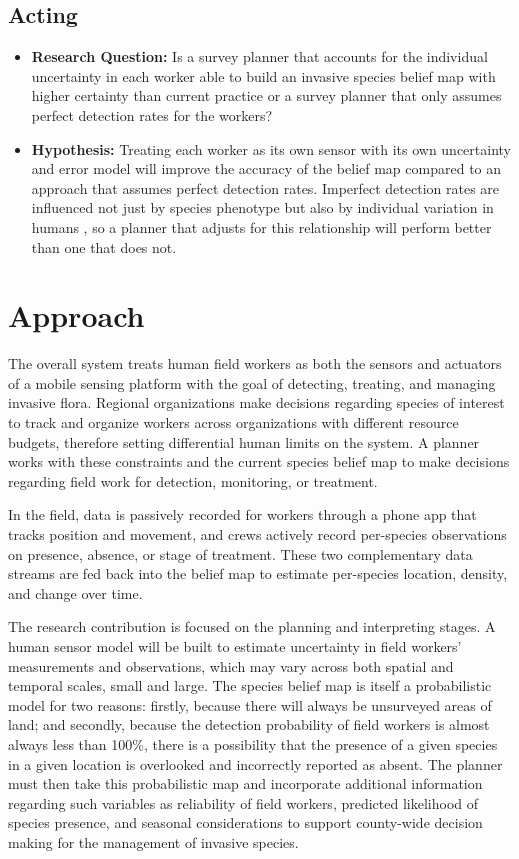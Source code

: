 \documentclass{article}
\begin{document}
\subsection{Acting}

    \begin{itemize}
        \item \textbf{Research Question:} Is a survey planner that accounts for the individual uncertainty in each worker able to build an invasive species belief map with higher certainty than current practice or a survey planner that only assumes perfect detection rates for the workers?

        \item \textbf{Hypothesis:} Treating each worker as its own sensor with its own uncertainty and error model will improve the accuracy of the belief map compared to an approach that assumes perfect detection rates. Imperfect detection rates are influenced not just by species phenotype but also by individual variation in humans \cite{detectability-global-weed}, so a planner that adjusts for this relationship will perform better than one that does not.
    \end{itemize}


\section{Approach}
The overall system treats human field workers as both the sensors and actuators of a mobile sensing platform with the goal of detecting, treating, and managing invasive flora. Regional organizations make decisions regarding species of interest to track and organize workers across organizations with different resource budgets, therefore setting differential human limits on the system. A planner works with these constraints and the current species belief map to make decisions regarding field work for detection, monitoring, or treatment.

In the field, data is passively recorded for workers through a phone app that tracks position and movement, and crews actively record per-species observations on presence, absence, or stage of treatment. These two complementary data streams are fed back into the belief map to estimate per-species location, density, and change over time. 

The research contribution is focused on the planning and interpreting stages. A human sensor model will be built to estimate uncertainty in field workers’ measurements and observations, which may vary across both spatial and temporal scales, small and large. The species belief map is itself a probabilistic model for two reasons: firstly, because there will always be unsurveyed areas of land; and secondly, because the detection probability of field workers is almost always less than 100\%, there is a possibility that the presence of a given species in a given location is overlooked and incorrectly reported as absent. The planner must then take this probabilistic map and incorporate additional information regarding such variables as reliability of field workers, predicted likelihood of species presence, and seasonal considerations to support county-wide decision making for the management of invasive species.
\end{document}
